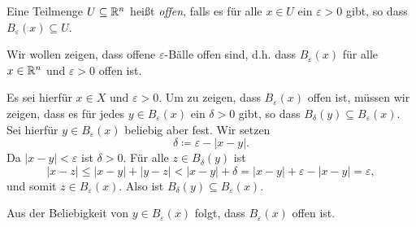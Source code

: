 \documentclass[a4paper,10pt]{article}
\begin{document}
\begin{defi}
 Eine Teilmenge $U \subseteq \mathbb{R}^n$ heißt \emph{offen}, falls es für alle $x \in U$ ein $\varepsilon > 0$ gibt, so dass $B_\varepsilon(x) \subseteq U$.
\end{defi}


\begin{bsp}
 Wir wollen zeigen, dass offene $\varepsilon$-Bälle offen sind, d.h. dass $B_\varepsilon(x)$ für alle $x \in \mathbb{R}^n$ und $\varepsilon > 0$ offen ist.
 
 Es sei hierfür $x \in X$ und $\varepsilon > 0$. Um zu zeigen, dass $B_\varepsilon(x)$ offen ist, müssen wir zeigen, dass es für jedes $y \in B_\varepsilon(x)$ ein $\delta > 0$ gibt, so dass $B_\delta(y) \subseteq B_\varepsilon(x)$. Sei hierfür $y \in B_\varepsilon(x)$ beliebig aber fest. Wir setzen
 \[
  \delta \coloneqq \varepsilon - |x-y|.
 \]
 Da $|x-y| < \varepsilon$ ist $\delta > 0$. Für alle $z \in B_\delta(y)$ ist
 \[
  |x-z|
  \leq |x-y| + |y-z|
  < |x-y| + \delta
  = |x-y| + \varepsilon - |x-y|
  = \varepsilon,
 \]
 und somit $z \in B_\varepsilon(x)$. Also ist $B_\delta(y) \subseteq B_\varepsilon(x)$. 
 \begin{center}
 \end{center}
 Aus der Beliebigkeit von $y \in B_\varepsilon(x)$ folgt, dass $B_\varepsilon(x)$ offen ist.
\end{bsp}
\end{document}

